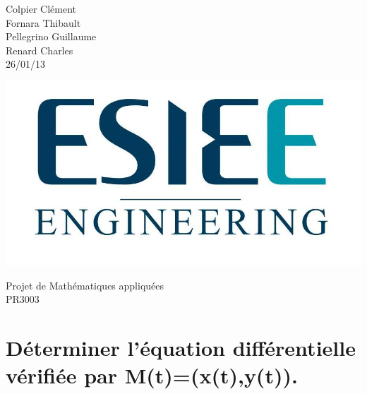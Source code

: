 \documentclass[10pt,a4paper]{article}
\begin{document}


\begin{minipage}{0.5\linewidth} %
Colpier Clément\\
Fornara Thibault\\
Pellegrino Guillaume\\
Renard Charles\\



26/01/13
\end{minipage}
\begin{minipage}{0.5\linewidth}
\begin{flushright}
\includegraphics[scale=0.2]{logo-esiee.jpg}

\end{flushright}
\end{minipage}


\vspace{8cm}

\begin{center}
\LARGE Projet de Mathématiques appliquées \\
\-
\LARGE PR3003
\\

\end{center}

\newpage
\tableofcontents              %
\clearpage


\section{Déterminer l'équation différentielle vérifiée par M(t)=(x(t),y(t)).}
\end{document}
